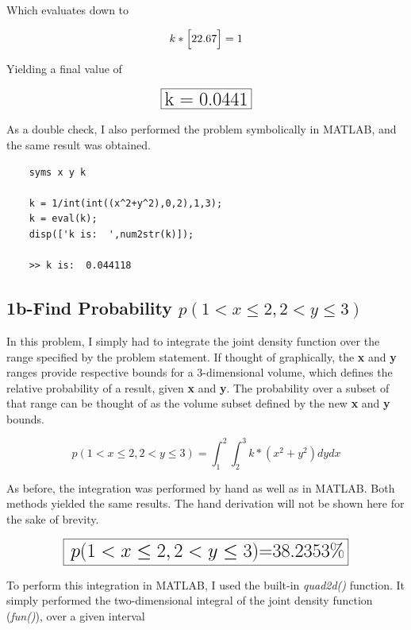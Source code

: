 \documentclass[]{article}
\begin{document}
\noindent Which evaluates down to

\begin{displaymath}
	k*\Big{ [ }  22.67 \Big{ ] } = 1 
\end{displaymath}

\noindent Yielding a final value of 

\begin{displaymath}
	\fbox {\LARGE k = 0.0441}
\end{displaymath}

\noindent As a double check, I also performed the problem symbolically in MATLAB, and the same result was obtained. 


\begin{lstlisting}
	syms x y k

	k = 1/int(int((x^2+y^2),0,2),1,3);
	k = eval(k);
	disp(['k is:  ',num2str(k)]);
	
	>> k is:  0.044118
\end{lstlisting}



\subsection*{1b-Find Probability $ p(1<x\le{2}, 2<y\le{3})   $}

In this problem, I simply had to integrate the joint density function over the range specified by the problem statement. If thought of graphically, the {\bf x} and {\bf y} ranges provide respective bounds for a 3-dimensional volume, which defines the relative probability of a result, given {\bf x} and {\bf y}. The probability over a subset of that range can be thought of as the volume subset defined by the new {\bf x} and {\bf y}  bounds. 

\begin{displaymath}
	p(1<x\le{2}, 2<y\le{3}) = \int_1^2{\int_2^3 {k*(x^2+y^2)   dy} dx }
\end{displaymath}  

\noindent As before, the integration was performed by hand as well as in MATLAB. Both methods yielded the same results. The hand derivation will not be shown here for the sake of brevity. 

\begin{displaymath}
	\fbox{ \LARGE $p(1<x\le{2}, 2<y\le{3})$=38.2353\%}  
\end{displaymath}  

\noindent To perform this integration in MATLAB, I used the built-in \emph{quad2d()} function. It simply performed the two-dimensional integral of the joint density function (\emph{fun()}), over a given interval
\end{document}
